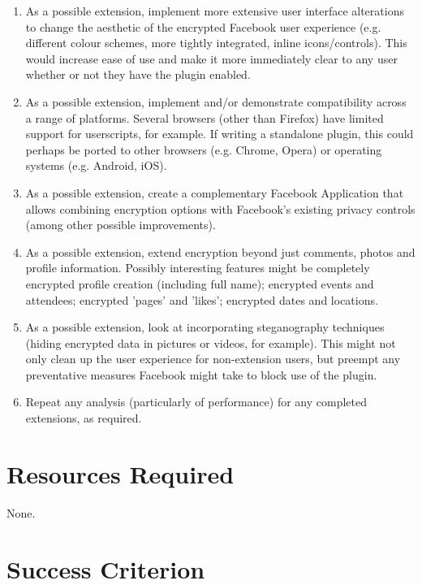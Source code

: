 \documentclass[12pt]{article}
\begin{document}
\begin{enumerate}
\item As a possible extension, implement more extensive user interface alterations to change the aesthetic of the encrypted Facebook user experience (e.g. different colour schemes, more tightly integrated, inline icons/controls). This would increase ease of use and make it more immediately clear to any user whether or not they have the plugin enabled.

\item As a possible extension, implement and/or demonstrate compatibility across a range of platforms. Several browsers (other than Firefox) have limited support for userscripts, for example. If writing a standalone plugin, this could perhaps be ported to other browsers (e.g. Chrome, Opera) or operating systems (e.g. Android, iOS).

\item As a possible extension, create a complementary Facebook Application that allows combining encryption options with Facebook's existing privacy controls (among other possible improvements).

\item As a possible extension, extend encryption beyond just comments, photos and profile information. Possibly interesting features might be completely encrypted profile creation (including full name); encrypted events and attendees; encrypted 'pages' and 'likes'; encrypted dates and locations.

\item As a possible extension, look at incorporating steganography techniques (hiding encrypted data in pictures or videos, for example). This might not only clean up the user experience for non-extension users, but preempt any preventative measures Facebook might take to block use of the plugin.

\item Repeat any analysis (particularly of performance) for any completed extensions, as required.


\end{enumerate}


\section*{Resources Required}

None.


\section*{Success Criterion}
\end{document}
